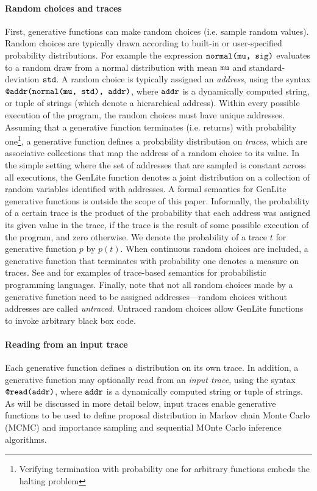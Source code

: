 \paragraph{Random choices and traces}
First, generative functions can make random choices (i.e. sample random values).
Random choices are typically drawn according to built-in or user-specified probability distributions.
For example the expression $\mbox{\texttt{normal(mu, sig)}}$ evaluates to a random draw from a normal distribution with mean $\mbox{\texttt{mu}}$ and standard-deviation $\mbox{\texttt{std}}$.
A random choice is typically assigned an \emph{address}, using the syntax $\mbox{\texttt{@addr(normal(mu, std), addr)}}$, where $\mbox{\texttt{addr}}$ is a dynamically computed string, or tuple of strings (which denote a hierarchical address).
Within every possible execution of the program, the random choices must have unique addresses.
Assuming that a generative function terminates (i.e. returns) with probability one\footnote{Verifying termination with probability one for arbitrary functions embeds the halting problem}, a generative function defines a probability distribution on \emph{traces}, which are associative collections that map the address of a random choice to its value.
In the simple setting where the set of addresses that are sampled is constant across all executions, the GenLite function denotes a joint distribution on a collection of random variables identified with addresses.
A formal semantics for GenLite generative functions is outside the scope of this paper.
Informally, the probability of a certain trace is the product of the probability that each address was assigned its given value in the trace, if the trace is the result of some possible execution of the program, and zero otherwise.
We denote the probability of a trace $t$ for generative function $p$ by $p(t)$.
When continuous random choices are included, a generative function that terminates with probability one denotes a measure on traces.
See \cite{CusumanoPLDI2018} and \cite{Borgstrom} for examples of trace-based semantics for probabilistic programming languages.
Finally, note that not all random choices made by a generative function need to be assigned addresses---random choices without addresses are called \emph{untraced}.
Untraced random choices allow GenLite functions to invoke arbitrary black box code.

\paragraph{Reading from an input trace}
Each generative function defines a distribution on its own trace.
In addition, a generative function may optionally read from an \emph{input trace}, using the syntax $\mbox{\texttt{@read(addr)}}$, where $\mbox{\texttt{addr}}$ is a dynamically computed string or tuple of strings.
As will be discussed in more detail below, input traces enable generative functions to be used to define proposal distribution in Markov chain Monte Carlo (MCMC) and importance sampling and sequential MOnte Carlo inference algorithms.

